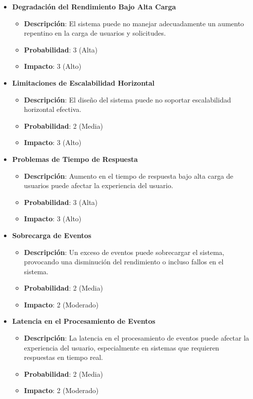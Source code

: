 \documentclass{article}
\begin{document}
\begin{itemize}
    \item \textbf{Degradación del Rendimiento Bajo Alta Carga}
          \begin{itemize}
              \item \textbf{Descripción}: El sistema puede no manejar adecuadamente un aumento repentino en la carga de usuarios y solicitudes.
              \item \textbf{Probabilidad}: 3 (Alta)
              \item \textbf{Impacto}: 3 (Alto)
          \end{itemize}

    \item \textbf{Limitaciones de Escalabilidad Horizontal}
          \begin{itemize}
              \item \textbf{Descripción}: El diseño del sistema puede no soportar escalabilidad horizontal efectiva.
              \item \textbf{Probabilidad}: 2 (Media)
              \item \textbf{Impacto}: 3 (Alto)
          \end{itemize}

    \item \textbf{Problemas de Tiempo de Respuesta}
          \begin{itemize}
              \item \textbf{Descripción}: Aumento en el tiempo de respuesta bajo alta carga de usuarios puede afectar la experiencia del usuario.
              \item \textbf{Probabilidad}: 3 (Alta)
              \item \textbf{Impacto}: 3 (Alto)
          \end{itemize}

    \item \textbf{Sobrecarga de Eventos}
          \begin{itemize}
              \item \textbf{Descripción}: Un exceso de eventos puede sobrecargar el sistema, provocando una disminución del rendimiento o incluso fallos en el sistema.
              \item \textbf{Probabilidad}: 2 (Media)
              \item \textbf{Impacto}: 2 (Moderado)
          \end{itemize}

    \item \textbf{Latencia en el Procesamiento de Eventos}
          \begin{itemize}
              \item \textbf{Descripción}: La latencia en el procesamiento de eventos puede afectar la experiencia del usuario, especialmente en sistemas que requieren respuestas en tiempo real.
              \item \textbf{Probabilidad}: 2 (Media)
              \item \textbf{Impacto}: 2 (Moderado)
          \end{itemize}
\end{itemize}
\end{document}
